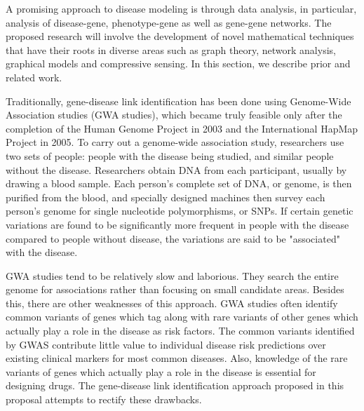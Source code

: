 A promising approach to disease modeling is through data analysis, in particular, analysis of disease-gene, phenotype-gene as well as gene-gene networks. The proposed research will involve the development of novel mathematical techniques that have their roots in diverse areas such as graph theory, network analysis, graphical models and compressive sensing. In this section, we describe prior and related work. 

Traditionally, gene-disease link identification has been done using Genome-Wide Association studies (GWA studies), which became truly feasible only after the completion of the Human Genome Project\cite{HumanGenomeProjectBook} in 2003 and the International HapMap Project\cite{HaplotypeLiu} in 2005. To carry out a genome-wide association study\cite{GWAurl, GWASZhang, GWASLi}, researchers use two sets of people: people with the disease being studied, and similar people without the disease. Researchers obtain DNA from each participant, usually by drawing a blood sample. Each person's complete set of DNA, or genome, is then purified from the blood, and specially designed machines then survey each person's genome for single nucleotide polymorphisms, or SNPs. If certain genetic variations are found to be significantly more frequent in people with the disease compared to people without disease, the variations are said to be "associated" with the disease.

GWA studies tend to be relatively slow and laborious. They search the entire genome for associations rather than focusing on small candidate areas. Besides this, there are other weaknesses of this approach. GWA studies often identify common variants of genes which tag along with rare variants of other genes which actually play a role in the disease as risk factors. The common variants identified by GWAS contribute little value to individual disease risk predictions over existing clinical markers for most common diseases. Also, knowledge of the rare variants of genes which actually play a role in the disease is essential for designing drugs. The gene-disease link identification approach proposed in this proposal attempts to rectify these drawbacks.

